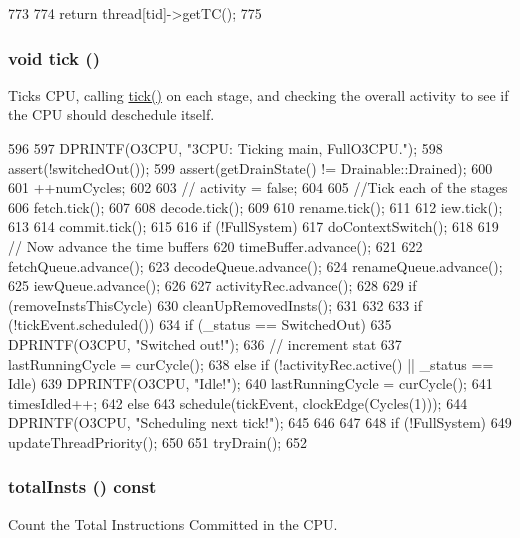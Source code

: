 \begin{DoxyCode}
773     {
774         return thread[tid]->getTC();
775     }
\end{DoxyCode}
\hypertarget{classFullO3CPU_a873dd91783f9efb4a590aded1f70d6b0}{
\subsubsection[{tick}]{\setlength{\rightskip}{0pt plus 5cm}void tick ()}}
\label{classFullO3CPU_a873dd91783f9efb4a590aded1f70d6b0}
Ticks CPU, calling \hyperlink{classFullO3CPU_a873dd91783f9efb4a590aded1f70d6b0}{tick()} on each stage, and checking the overall activity to see if the CPU should deschedule itself. 


\begin{DoxyCode}
596 {
597     DPRINTF(O3CPU, "\n\nFullO3CPU: Ticking main, FullO3CPU.\n");
598     assert(!switchedOut());
599     assert(getDrainState() != Drainable::Drained);
600 
601     ++numCycles;
602 
603 //    activity = false;
604 
605     //Tick each of the stages
606     fetch.tick();
607 
608     decode.tick();
609 
610     rename.tick();
611 
612     iew.tick();
613 
614     commit.tick();
615 
616     if (!FullSystem)
617         doContextSwitch();
618 
619     // Now advance the time buffers
620     timeBuffer.advance();
621 
622     fetchQueue.advance();
623     decodeQueue.advance();
624     renameQueue.advance();
625     iewQueue.advance();
626 
627     activityRec.advance();
628 
629     if (removeInstsThisCycle) {
630         cleanUpRemovedInsts();
631     }
632 
633     if (!tickEvent.scheduled()) {
634         if (_status == SwitchedOut) {
635             DPRINTF(O3CPU, "Switched out!\n");
636             // increment stat
637             lastRunningCycle = curCycle();
638         } else if (!activityRec.active() || _status == Idle) {
639             DPRINTF(O3CPU, "Idle!\n");
640             lastRunningCycle = curCycle();
641             timesIdled++;
642         } else {
643             schedule(tickEvent, clockEdge(Cycles(1)));
644             DPRINTF(O3CPU, "Scheduling next tick!\n");
645         }
646     }
647 
648     if (!FullSystem)
649         updateThreadPriority();
650 
651     tryDrain();
652 }
\end{DoxyCode}
\hypertarget{classFullO3CPU_a7e01d94bb5a6e15fa8c94bcdf276115d}{
\subsubsection[{totalInsts}]{ totalInsts () const}}
\label{classFullO3CPU_a7e01d94bb5a6e15fa8c94bcdf276115d}
Count the Total Instructions Committed in the CPU. 


